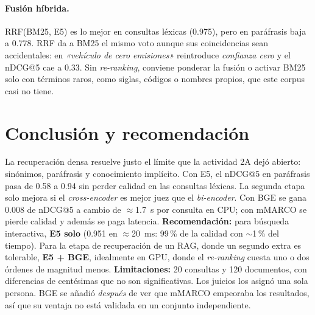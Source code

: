 \documentclass[10pt,a4paper]{article}
\newcommand{\q}[1]{\emph{«#1»}}
\begin{document}
\paragraph{Fusión híbrida.} RRF(BM25, E5) es lo mejor en consultas léxicas (0.975), pero en paráfrasis
baja a 0.778. RRF da a BM25 el mismo voto aunque sus coincidencias sean accidentales: en \q{vehículo de
cero emisiones} reintroduce \emph{confianza cero} y el nDCG@5 cae a 0.33. Sin \emph{re-ranking},
conviene ponderar la fusión o activar BM25 solo con términos raros, como siglas, códigos o nombres propios,
que este corpus casi no tiene.

\section{Conclusión y recomendación}

La recuperación densa resuelve justo el límite que la actividad 2A dejó abierto: sinónimos,
paráfrasis y conocimiento implícito. Con E5, el nDCG@5 en paráfrasis pasa de 0.58 a 0.94 sin perder
calidad en las consultas léxicas. La segunda etapa solo mejora si el \emph{cross-encoder} es mejor juez
que el \emph{bi-encoder}. Con BGE se gana 0.008 de nDCG@5 a cambio de $\approx$1.7~s por consulta en CPU;
con mMARCO se pierde calidad y además se paga latencia.
\textbf{Recomendación:} para búsqueda interactiva, \textbf{E5 solo} (0.951 en $\approx$20~ms: 99\,\% de
la calidad con $\sim$1\,\% del tiempo). Para la etapa de recuperación de un RAG, donde un segundo extra es
tolerable, \textbf{E5 + BGE}, idealmente en GPU, donde el \emph{re-ranking} cuesta uno o dos órdenes de
magnitud menos.
\textbf{Limitaciones:} 20 consultas y 120 documentos, con diferencias de centésimas que no son
significativas. Los juicios los asignó una sola persona. BGE se añadió \emph{después} de ver que mMARCO
empeoraba los resultados, así que su ventaja no está validada en un conjunto independiente.
\end{document}
